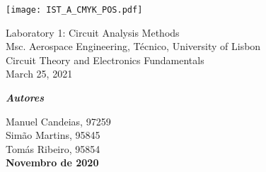 \thispagestyle {empty}

\begin{titlepage}
\texttt{[image: IST\_A\_CMYK\_POS.pdf]}

\begin{center}
%
\vspace{1.0cm}

\vspace{1cm}
{\FontLb Laboratory 1: Circuit Analysis Methods} \\ %
\vspace{1cm}
{\FontSn Msc. Aerospace Engineering, Técnico, University of Lisbon} \\
\vspace{1cm}
{\FontSn Circuit Theory and Electronics Fundamentals} \\
\vspace{1cm}
{\FontSn March 25, 2021} \\
%
\end{center}

\vspace{2cm}


\textbf{\emph{Autores}\\[0.06in]}

Manuel Candeias, 97259\\
Simão Martins, 95845\\
Tomás Ribeiro, 95854\\ 
\vspace{2cm}
\textbf{Novembro de 2020}

\end{titlepage}

